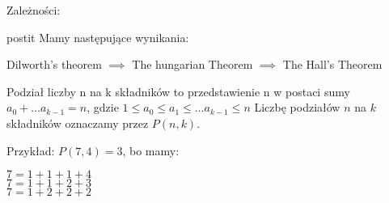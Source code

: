 \documentclass{beamer}
\begin{document}
\begin{frame}

{
  \begin{block}{Zależności:}
{\small
{}
\begin{beamercolorbox}[sep=1em]{postit}
Mamy następujące wynikania:
\end{beamercolorbox}
}      
Dilworth's theorem $\implies$ The hungarian Theorem $\implies$ The Hall's Theorem
\end{block}
}
  
\end{frame}



\begin{frame}
Podział liczby n na k składników to przedstawienie n
 w postaci sumy
$a_0 + \dots a_{k-1} = n$,
gdzie $1 \leq a_0 \leq a_1 \leq \ldots a_{k-1} \leq n$
Liczbę podziałów $n$ na $k$ składników oznaczamy przez $P(n,k)$.

Przykład: 
$P(7, 4) = 3$, bo mamy:
\begin{tabbing}
$7 = 1 + 1 + 1 + 4$ \\
$7 = 1 + 1 + 2 + 3$ \\
$7 = 1 + 2 + 2 + 2$ \\
\end{tabbing}
\end{frame}

\begin{frame}
\end{frame}
\end{document}
